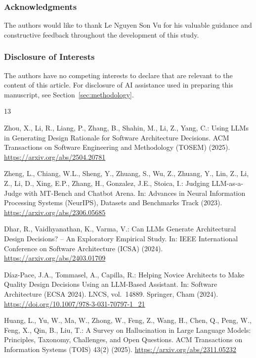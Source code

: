 \documentclass[runningheads]{llncs}
\begin{document}
\subsubsection*{Acknowledgments}
The authors would like to thank Le Nguyen Son Vu for his valuable guidance and constructive feedback throughout the development of this study.

\subsubsection*{Disclosure of Interests}
The authors have no competing interests to declare that are relevant to the content of this article. For disclosure of AI assistance used in preparing this manuscript, see Section~\ref{sec:methodology}.


\begin{thebibliography}{13}

Zhou, X., Li, R., Liang, P., Zhang, B., Shahin, M., Li, Z., Yang, C.:
Using LLMs in Generating Design Rationale for Software Architecture Decisions.
ACM Transactions on Software Engineering and Methodology (TOSEM) (2025).
\url{https://arxiv.org/abs/2504.20781}

Zheng, L., Chiang, W.L., Sheng, Y., Zhuang, S., Wu, Z., Zhuang, Y., Lin, Z., Li, Z., Li, D., Xing, E.P., Zhang, H., Gonzalez, J.E., Stoica, I.:
Judging LLM-as-a-Judge with MT-Bench and Chatbot Arena.
In: Advances in Neural Information Processing Systems (NeurIPS), Datasets and Benchmarks Track (2023).
\url{https://arxiv.org/abs/2306.05685}

Dhar, R., Vaidhyanathan, K., Varma, V.:
Can LLMs Generate Architectural Design Decisions? -- An Exploratory Empirical Study.
In: IEEE International Conference on Software Architecture (ICSA) (2024).
\url{https://arxiv.org/abs/2403.01709}

D\'{i}az-Pace, J.A., Tommasel, A., Capilla, R.:
Helping Novice Architects to Make Quality Design Decisions Using an LLM-Based Assistant.
In: Software Architecture (ECSA 2024). LNCS, vol.\ 14889. Springer, Cham (2024).
\url{https://doi.org/10.1007/978-3-031-70797-1_21}

Huang, L., Yu, W., Ma, W., Zhong, W., Feng, Z., Wang, H., Chen, Q., Peng, W., Feng, X., Qin, B., Liu, T.:
A Survey on Hallucination in Large Language Models: Principles, Taxonomy, Challenges, and Open Questions.
ACM Transactions on Information Systems (TOIS) 43(2) (2025).
\url{https://arxiv.org/abs/2311.05232}


\end{thebibliography}
\end{document}
